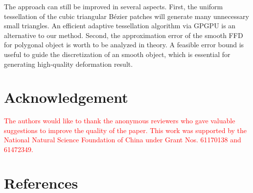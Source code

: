 \documentclass[3p]{elsarticle}
\begin{document}
The approach can still be improved in several aspects. First, the uniform tessellation of the cubic triangular B\'ezier
patches will generate many unnecessary small triangles. An efficient adaptive tessellation algorithm via GPGPU is an
alternative to our method. Second, the approximation error of the smooth FFD for polygonal object is worth to be
analyzed in theory. A feasible error bound is useful to guide the discretization of an smooth object, which is essential
for generating high-quality deformation result.

\section{Acknowledgement}

\textcolor{red}{
The authors would like to thank the anonymous reviewers who gave valuable suggestions to improve the quality of the
paper. This work was supported by the National Natural Science Foundation of China under Grant Nos. 61170138 and
61472349.
}

\section*{References}


\end{document}

